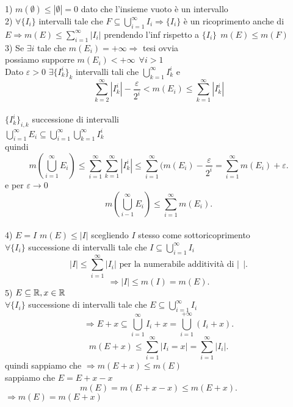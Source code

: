 \documentclass[12px]{article}
\begin{document}
	\begin{dimo}
		1) $m(\emptyset)\leq |\emptyset| = 0$ dato che l'insieme vuoto è un intervallo\\
		2)  $\forall\{I_i\}$ intervalli tale che  $F\subseteq \bigcup^{\infty}_{i=1} I_i \Rightarrow \{I_i\}$   è un ricoprimento anche di $E \Rightarrow m(E) \leq \sum^{\infty}_{i=1}|I_i|$ prendendo l'inf rispetto a $\{I_i\}\ \ m(E)\leq m(F)$\\
		3) Se $\exists i$ tale che $m(E_i) = +\infty \Rightarrow $  tesi ovvia\\
		possiamo supporre $m(E_i) < +\infty \ \ \forall i > 1$\\
		Dato  $\varepsilon > 0$  $\exists \{I^i_k\}_k$ intervalli tali che  $\bigcup^{\infty}_{k=1}I_k^i$ e \[ \sum^{\infty}_{k=2}|I_k^i| - \frac \varepsilon {2^i} < m(E_i)\leq \sum^{\infty}_{k=1}|I_k^i|\]\\
		$\{I_k^i\}_{i,k}$ successione di intervalli\\
		 $\displaystyle \bigcup^{\infty}_{i=1}E_i\subseteq \bigcup^{\infty}_{i=1}\bigcup^{\infty}_{k=1}I_k^i$ \\
		 quindi 
		 \[
		 m( \bigcup^{\infty}_{i=1}E_i)\leq \sum^{\infty}_{i=1} \sum^{\infty}_{k=1}|I_k^i| \leq \sum^{\infty}_{i = 1}(m(E_i) - \frac{\varepsilon}{2^i} = \sum^{\infty}_{i = 1}m(E_i) + \varepsilon
		 .\] 
		 e per $ \varepsilon \rightarrow 0$
		 \[
		 m( \bigcup^{\infty}_{i-1}E_i)\leq \sum^{\infty}_{i=1}m(E_i)
		 .\] 
		 \newpage \ \\
		 4) $E = I$  $m(E) \leq |I|$ scegliendo  $I$ stesso come sottoricoprimento \\
		 $\forall \{ I_i\}$ successione di intervalli tale che  $I\subseteq \bigcup^{\infty}_{i=1}I_i$\\
		 \[
			 |I|\leq \sum^{\infty}_{i=1}|I_i| \text{ per la numerabile additività di } |\ \ | 
		 .\] 
		 \[
		 \Rightarrow  |I|\leq m(I) = m(E)
		 .\] 
		 5) $E\subseteq \mathbb{R}, x\in\mathbb{R}$\\
		 $\forall \{I_i\}$ successione di intervalli tale che $E\subseteq \bigcup^{\infty}_{i=1}I_i$\\
		 \[
		  \Rightarrow E + x \subseteq \bigcup^{\infty}_{i=1}I_i + x = \bigcup^{+\infty}_{i=1}(I_i + x)
		 .\] 
		 \[
		 m(E+ x) \leq \sum^{\infty}_{i= 1}|I_i = x| = \sum^{\infty}_{i=1}|I_i|
		 .\] 
		 quindi sappiamo che $ \Rightarrow m(E + x) \leq m(E)$\\
		 sappiamo che $E = E+x - x$\\
		  \[
		  m(E) = m(E + x -x )\leq m(E + x)
		  .\] 
		  $ \Rightarrow m(E) = m(E + x)$ \\


	\end{dimo}
\end{document}
